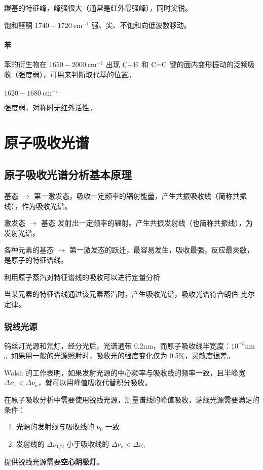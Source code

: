羰基的特征峰，峰强很大（通常是红外最强峰），同时尖锐。

饱和醛酮 $1740 - 1720 \ \mathrm{cm}^{-1}$ 强、尖、不饱和向低波数移动。

\paragraph{苯}

苯的衍生物在 $1650 - 2000 \ \mathrm{cm}^{-1}$ 出现 $\ce{C-H}$ 和 $\ce{C=C}$ 键的面内变形振动的泛频吸收（强度弱），可用来判断取代基的位置。


\paragraph{} $1620 - 1680 \ \mathrm{cm}^{-1}$

强度弱，对称时无红外活性。


\section{原子吸收光谱}

\subsection{原子吸收光谱分析基本原理}

基态 $\rightarrow$ 第一激发态，吸收一定频率的辐射能量，产生共振吸收线（简称共振线），作为吸收光谱。

激发态 $\rightarrow$ 基态 发射出一定频率的辐射。产生共振发射线（也简称共振线），为发射光谱。

各种元素的基态 $\rightarrow$ 第一激发态的跃迁，最容易发生，吸收最强，反应最灵敏，是原子的特征谱线。

利用原子蒸汽对特征谱线的吸收可以进行定量分析

当某元素的特征谱线通过该元素蒸汽时，产生吸收光谱，吸收光谱符合朗伯-比尔定律。


\subsubsection{锐线光源}

钨丝灯光源和氘灯，经分光后，光谱通带 $0.2 \mathrm{nm}$，而原子吸收线半宽度：$10^{-3} \mathrm{nm}$。如果用一般的光源照射时，吸收光的强度变化仅为 0.5\%，灵敏度很差。

Walsh 的工作表明，如果发射光源的中心频率与吸收线的频率一致，且半峰宽 $\Delta \nu _e < \Delta \nu _a$，就可以用峰值吸收代替积分吸收。

在原子吸收分析中需要使用锐线光源，测量谱线的峰值吸收，瑞线光源需要满足的条件：

\begin{enumerate}
    \item 光源的发射线与吸收线的 $\nu_0$ 一致
    \item 发射线的 $\Delta \nu _{1/2}$ 小于吸收线的 $\Delta \nu _e < \Delta \nu _a$
\end{enumerate}


提供锐线光源需要\textbf{空心阴极灯}。
